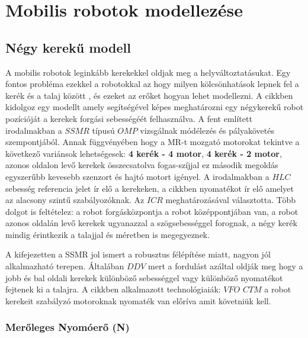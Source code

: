 

\section{Mobilis robotok modellezése} 

\subsection*{Négy kerekű modell}
A mobilis robotok leginkább kerekekkel oldjak meg a helyváltoztatásukat. Egy fontos probléma ezekkel a robotokkal az hogy milyen kölcsönhatások lepnek fel a kerék és a talaj között \cite{Torjancki4Mobilerobot} \cite{RobustMotionControl} \cite{Campa2014}, és ezeket az erőket hogyan lehet modellezni. A \cite{Torjancki4Mobilerobot} cikkben kidolgoz egy modellt amely segítségével képes meghatározni egy négykerekű robot pozícióját a kerekek forgási sebességéét felhasználva. A fent említett irodalmakban a $SSMR$  típusú $OMP$ vizsgálnak módélezés és pályakövetés szempontjából. Annak függvényében hogy a MR-t mozgató motorokat tekintve a következő variánsok lehetségesek: \textbf{4 kerék - 4 motor}, \textbf{4 kerék - 2 motor}, azonos oldalon levő kerekek összecsatolva fogas-szíjjal ez második megoldás egyszerűbb kevesebb szenzort és hajtó motort igényel.
A \cite{Torjancki4Mobilerobot} \cite{Campa2014} irodalmakban a $HLC$ sebesség referencia jelet ír elő a kerekeken, \cite{RobustMotionControl} a cikkben nyomatékot ír elő amelyet az alacsony szintű szabályozóknak.
Az $ICR$ meghatározásával választotta. Több dolgot is feltételez: a robot forgásközpontja a robot középpontjában van, a robot azonos oldalán levő kerekek ugyanazzal a szögsebességgel forognak, a négy kerék mindig érintkezik a talajjal és méretben is megegyeznek.

A \cite{RobustMotionControl} kifejezetten a SSMR  jol ismert a robusztus félépítése miatt, nagyon jól alkalmazható terepen. Általában $DDV$ mert a fordulást azáltal oldják meg hogy a jobb és bal oldali kerekek különböző sebességgel vagy különböző nyomatékot fejtenek ki a talajra.
A \cite{RobustMotionControl} cikkben alkalmazott technológiaiák: $VFO$
$CTM$ a robot kerekeit szabályzó motoroknak nyomaték van előríva amit követniük kell.

\subsubsection{Merőleges Nyomóerő (N)} 


